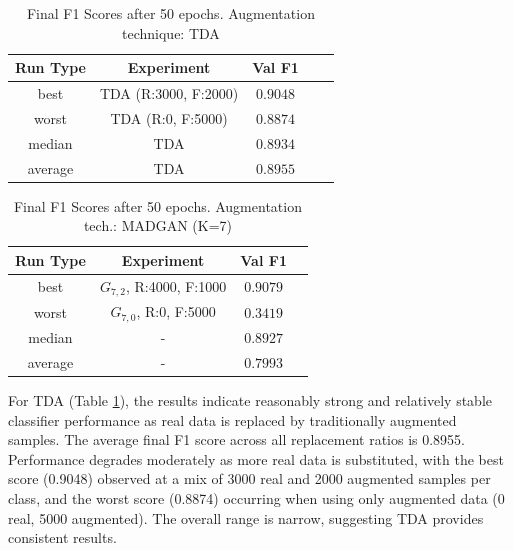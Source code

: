 \begin{table}[H]
	\centering
	\vspace{-1.5em}
	\begin{tabular}{|c|c|c|c|c|}
		\hline
		Run Type & Experiment & Val F1 \\ \hline
		best & TDA (R:3000, F:2000) & $0.9048$\\ \hline
		worst & TDA (R:0, F:5000) & $0.8874$\\ \hline
		median & TDA & $0.8934$\\ \hline
		average & TDA & $0.8955$
		\\ \hline
	\end{tabular}
    \caption{Final F1 Scores after 50 epochs. Augmentation technique: TDA}
        \label{tab:res_replacement_fashion_tda_vs_madgan__tda}
\end{table}
\begin{table}[H]
	\vspace{-1.5em}
	\centering
	\begin{tabular}{|c|c|c|c|}
		\hline
		Run Type & Experiment & Val F1 \\ \hline
		best & \(G_{7, 2}\), R:4000, F:1000 & $0.9079$\\ \hline
		worst & \(G_{7, 0}\), R:0, F:5000 & $0.3419$\\ \hline
		median & - & $0.8927$\\ \hline
		average & - & $0.7993$
		\\ \hline
	\end{tabular}
    \caption{Final F1 Scores after 50 epochs. Augmentation tech.: MADGAN (K=7)}
        \label{tab:res_replacement_fashion_tda_vs_madgan__madgan}
\end{table}
For TDA (Table \ref{tab:res_replacement_fashion_tda_vs_madgan__tda}), the results indicate reasonably strong and relatively stable classifier performance as real data is replaced by traditionally augmented samples. The average final F1 score across all replacement ratios is 0.8955. Performance degrades moderately as more real data is substituted, with the best score (0.9048) observed at a mix of 3000 real and 2000 augmented samples per class, and the worst score (0.8874) occurring when using only augmented data (0 real, 5000 augmented). The overall range is narrow, suggesting TDA provides consistent results.


